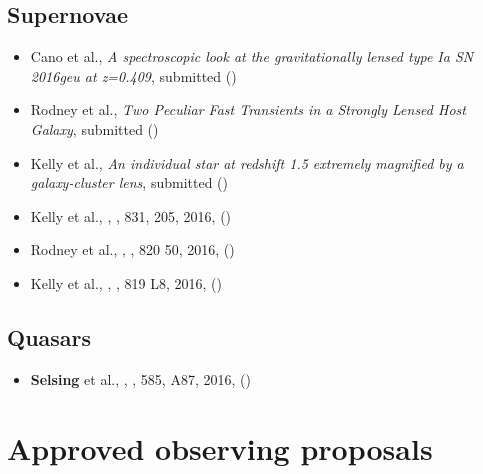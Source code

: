 \documentclass[12pt,letterpaper]{article}
\begin{document}
    \subsection*{Supernovae}
    \begin{itemize}

\item Cano et al.,
	{\it A spectroscopic look at the gravitationally lensed type Ia SN 2016geu at z=0.409},
	submitted ()

\item Rodney et al.,
{\it Two Peculiar Fast Transients in a Strongly Lensed Host Galaxy},
submitted ()

\item Kelly et al.,
	{\it An individual star at redshift 1.5 extremely magnified by a galaxy-cluster lens},
	submitted ()
	
\item Kelly et al.,
	,
	\apj, 831, 205, 2016, ()

\item Rodney et al.,
	,
	\apj, 820 50, 2016, ()

\item Kelly et al.,
	,
	\apjl, 819 L8, 2016, ()



	\end{itemize}



    \subsection*{Quasars}
\begin{itemize}
	
\item \textbf{Selsing} et al.,
	,
	\aanda, 585, A87, 2016, ()

\end{itemize}


\section*{Approved observing proposals}
\end{document}

